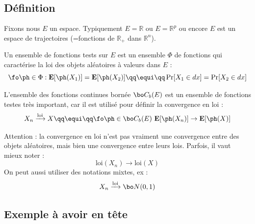 \documentclass{article}
\def\loi{\text{loi}}
\begin{document}
\subsection{Définition}

Fixons nous  $E$ un espace. Typiquement $E=\mathbb R$ ou $E=\mathbb R^p$ ou encore $E$ est un espace de trajectoires (=fonctions de $\mathbb R_+$ dans $\mathbb R^n$). 

Un ensemble de fonctions tests sur $E$ est un ensemble $\Phi$ de fonctions qui caractérise la loi des objets aléatoires à valeurs dans $E$ : 
$$
\fo \ph \in \Phi :   \mathbf E[ \ph(X_1)]=\mathbf E[\ph(X_2) ]   \qq \equi \qq \Pr[X_1\in dx] = \Pr[X_2\in dx]  
$$


L'ensemble des fonctions continues bornée $\bo C_b(E)$ est un ensemble de fonctions testes très important, car il est utilisé pour définir la convergence en loi : 
$$
X_n   \xrightarrow{\text{loi}}   X   \qq \equi \qq     \fo \ph \in  \bo C_b(E) \      \mathbf E[ \ph(X_n)] \to \mathbf E[\ph(X)]
$$

Attention :  la convergence en loi n'est pas vraiment une convergence entre des objets aléatoires, mais bien une convergence entre leurs lois. Parfois, il vaut mieux noter : 
$$
\text{loi} (X_n) \to \loi(X)
$$
On peut aussi utiliser des notations mixtes, ex  : 
 $$
 X_n   \xrightarrow{\text{loi}}   \bo N(0,1)
 $$

\subsection{Exemple à avoir en tête}
\end{document}
